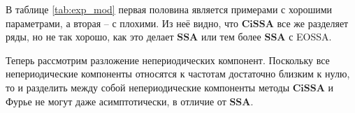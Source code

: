 \documentclass[a4paper, 11pt]{article}
\newcommand{\SSA}{\textbf{SSA}}
\newcommand{\CISSA}{\textbf{CiSSA}}
\newcommand{\TS}{\mathsf{X}}
\begin{document}
В таблице \ref{tab:exp_mod} первая половина является примерами с хорошими параметрами, а вторая -- с плохими. Из неё видно, что $\CISSA$ все же разделяет ряды, но не так хорошо, как это делает $\SSA$ или тем более $\SSA$ с EOSSA.



Теперь рассмотрим разложение непериодических компонент. Поскольку все непериодические компоненты относятся к частотам достаточно близким к нулю, то и разделить между собой непериодические компоненты методы $\CISSA$ и Фурье не могут даже асимптотически, в отличие от $\SSA$.


%
%
%
%
%
%
\end{document}
